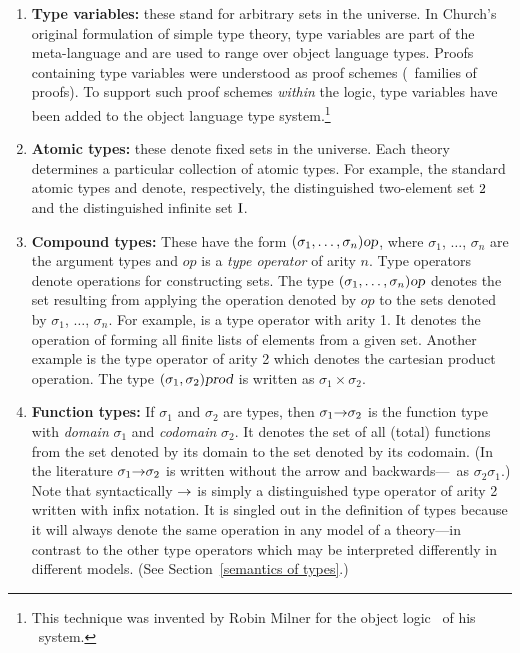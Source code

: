 \begin{enumerate}

\item {\bf Type variables:} these stand for arbitrary
sets in the universe.  In Church's original formulation of simple type
theory, type variables are part of the meta-language and are used to
range over object language types.  Proofs containing type variables
were understood as proof schemes (\ie\ families of proofs). To support
such proof schemes {\it within} the \HOL{} logic, type variables have
been added to the object language type system.\footnote{This technique
was invented by Robin Milner for the object logic \PPL\ of his \LCF\
system.}

\item {\bf Atomic types:} these denote fixed sets in the universe. Each
theory determines a particular collection of atomic types.  For
example, the standard atomic types  and  denote,
respectively, the distinguished two-element set $\mbox{\rm 2}$ and the
distinguished infinite set $\mbox{\rm I}$.

\item {\bf Compound types:} These have the
form $(\sigma_1,\ldots,\sigma_n)\textsl{op}$, where $\sigma_1$, $\dots$,
$\sigma_n$ are the argument types and $op$ is a {\it type operator\/}
of arity $n$.  Type operators denote operations for constructing sets.
The type $(\sigma_1,\ldots,\sigma_n)\textsl{op}$ denotes the set resulting
from applying the operation denoted by $op$ to the sets denoted by
$\sigma_1$, $\dots$, $\sigma_n$.  For example,
 is a type operator with arity 1.  It denotes the operation
of forming all finite lists of elements from a given set.  Another
example is the type operator \ty{prod} of arity 2 which denotes the
cartesian product operation.  The type $(\sigma_1,\sigma_2)\textsl{prod}$
is written as $\sigma_1\times\sigma_2$.

\item {\bf Function types:} If $\sigma_1$
and $\sigma_2$ are types, then $\sigma_1{\to}\sigma_2$ is the function
type with {\it domain\/} $\sigma_1$ and {\it codomain} $\sigma_2$. It
denotes the set of all (total) functions from the set denoted by its
domain to the set denoted by its codomain. (In the literature
$\sigma_1{\to}\sigma_2$ is written without the arrow and
backwards---\ie\ as $\sigma_2\sigma_1$.) Note that syntactically
${\to}$ is simply a distinguished type operator of arity 2 written with
infix notation. It is singled out in the definition of \HOL{} types
because it will always denote the same operation in any
model of a \HOL{} theory---in contrast to the other type operators which
may be interpreted differently in different models. (See
Section~\ref{semantics of types}.)


\end{enumerate}

